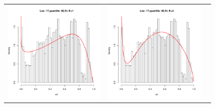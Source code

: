 \documentclass[10pt]{report}
\begin{document}
\begin{figure}[h]
\begin{tabular}{ccc}
\includegraphics[width=\textwidth/3]{../img/loc17/quantile90/fit_K1.pdf}
&
\includegraphics[width=\textwidth/3]{../img/loc17/quantile90/fit_K2.pdf}
&

\end{tabular}
\end{figure}
\end{document}
